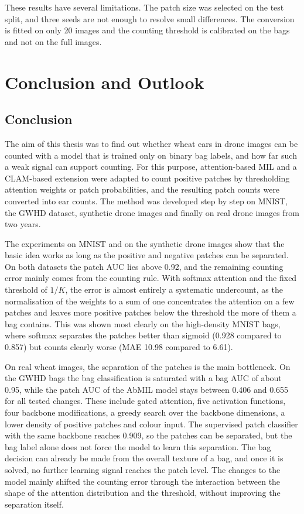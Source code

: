 \documentclass[12pt,parskip = half, DIV=classic,listof=totoc]{scrartcl}
\begin{document}
		These results have several limitations. The patch size was selected on the test split, and three 
		seeds are not enough to resolve small differences. The conversion is fitted on only 20 images and 
		the counting threshold is calibrated on the bags and not on the full images.

		\section{Conclusion and Outlook}
		\subsection{Conclusion}
			The aim of this thesis was to find out whether wheat ears in drone images can be counted with a model 
			that is trained only on binary bag labels, and how far such a weak signal can support counting. 
			For this purpose, attention-based MIL and a CLAM-based extension were adapted to count positive patches 
			by thresholding attention weights or patch probabilities, and the resulting patch counts were converted 
			into ear counts. The method was developed step by step on MNIST, the GWHD dataset, synthetic drone images 
			and finally on real drone images from two years.

			The experiments on MNIST and on the synthetic drone images show that the basic idea works as long as the 
			positive and negative patches can be separated. On both datasets the patch AUC lies above 0.92, and the 
			remaining counting error mainly comes from the counting rule. With softmax attention and the fixed threshold 
			of $1/K$, the error is almost entirely a systematic undercount, as the normalisation of the weights to a sum 
			of one concentrates the attention on a few patches and leaves more positive patches below the threshold the 
			more of them a bag contains. This was shown most clearly on the high-density MNIST bags, where softmax 
			separates the patches better than sigmoid (0.928 compared to 0.857) but counts clearly worse 
			(MAE 10.98 compared to 6.61).

			On real wheat images, the separation of the patches is the main bottleneck. On the GWHD bags the bag 
			classification is saturated with a bag AUC of about 0.95, while the patch AUC of the AbMIL model stays 
			between 0.406 and 0.655 for all tested changes. These include gated attention, five activation functions, 
			four backbone modifications, a greedy search over the backbone dimensions, a lower density of positive 
			patches and colour input. The supervised patch classifier with the same backbone reaches 0.909, so the 
			patches can be separated, but the bag label alone does not force the model to learn this separation. 
			The bag decision can already be made from the overall texture of a bag, and once it is solved, no further 
			learning signal reaches the patch level. The changes to the model mainly shifted the counting error through 
			the interaction between the shape of the attention distribution and the threshold, without improving the 
			separation itself.
\end{document}
